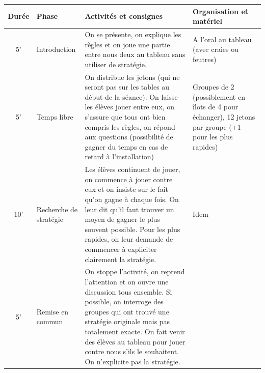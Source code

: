 \documentclass[12pt, a4paper]{article}
\begin{document}
	\begin{longtable}{c|m{3.9cm}|m{8.4cm}|m{2.4cm}}		\textbf{Durée} & \textbf{Phase} & \textbf{Activités et consignes} & \textbf{Organisation et matériel} \\ \hline\hline
		
		5' &
		
		Introduction
		
		&
		
		On se présente, on explique les règles et on joue une partie entre nous deux au tableau sans utiliser de stratégie.
		
		& 
		
		A l'oral au tableau (avec craies ou feutres)
		
		\\ \hline	
		
		5' & 
		
		Temps libre
		
		&
		
		On distribue les jetons (qui ne seront pas sur les tables au début de la séance).
		On laisse les élèves jouer entre eux, on s'assure que tous ont bien compris les règles, on répond aux questions (possibilité de gagner du temps en cas de retard à l'installation)
		
		& 
		
		Groupes de 2 (possiblement en îlots de 4 pour échanger), 12 jetons par groupe (+1 pour les plus rapides)
		
		\\ \hline
		
		10'
		
		&
		
		Recherche de stratégie
		
		& 
		
		Les élèves continuent de jouer, on commence à jouer contre eux et on insiste sur le fait qu'on gagne à chaque fois. 
		On leur dit qu'il faut trouver un moyen de gagner le plus souvent possible. Pour les plus rapides, on leur demande de commencer à expliciter clairement la stratégie.
		
		& Idem
		
		\\ \hline
		
		5' &
		
		Remise en commun
		
		&
		
		On stoppe l'activité, on reprend l'attention et on ouvre une discussion tous ensemble. Si possible, on interroge des groupes qui ont trouvé une stratégie originale mais pas totalement exacte. On fait venir des élèves au tableau pour jouer contre nous s'ils le souhaitent. On n'explicite pas la stratégie.
		

\end{longtable}
\end{document}
